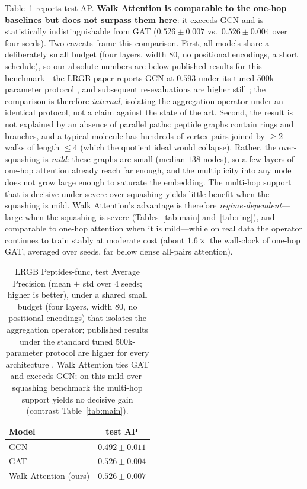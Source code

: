 Table~\ref{tab:lrgb} reports test AP. \textbf{Walk Attention is comparable to
the one-hop baselines but does not surpass them here}: it exceeds GCN and is
statistically indistinguishable from GAT ($0.526\pm0.007$ vs.\ $0.526\pm0.004$
over four seeds). Two caveats frame this comparison. First, all models share a
deliberately small budget (four layers, width $80$, no positional encodings, a
short schedule), so our absolute numbers are below published results for this
benchmark---the LRGB paper reports GCN at $0.593$ under its tuned
$500$k-parameter protocol \cite{dwivedi2022lrgb}, and subsequent re-evaluations
are higher still \cite{tonshoff2023where}; the comparison is therefore
\emph{internal}, isolating the aggregation operator under an identical protocol,
not a claim against the state of the art. Second, the result is not explained by an
absence of parallel paths: peptide graphs contain rings and branches, and a
typical molecule has hundreds of vertex pairs joined by $\ge 2$ walks of length
$\le 4$ (which the quotient ideal would collapse). Rather, the over-squashing is
\emph{mild}: these graphs are small (median $138$ nodes), so a few layers of
one-hop attention already reach far enough, and the multiplicity into any node
does not grow large enough to saturate the embedding. The multi-hop support that
is decisive under severe over-squashing yields little benefit when the squashing
is mild. Walk Attention's advantage is therefore \emph{regime-dependent}---large
when the squashing is severe (Tables~\ref{tab:main} and~\ref{tab:ring}), and
comparable to one-hop attention when it is mild---while on real data the operator
continues to train stably at moderate cost (about $1.6\times$ the wall-clock of
one-hop GAT, averaged over seeds, far below dense all-pairs attention).

\begin{table}[t]
\centering
\caption{LRGB Peptides-func, test Average Precision (mean $\pm$ std over 4
seeds; higher is better), under a shared small budget (four layers, width $80$,
no positional encodings) that isolates the aggregation operator; published
results under the standard tuned $500$k-parameter protocol are higher for every
architecture \cite{dwivedi2022lrgb,tonshoff2023where}. Walk Attention ties GAT
and exceeds GCN; on this mild-over-squashing benchmark the multi-hop support
yields no decisive gain (contrast Table~\ref{tab:main}).}
\label{tab:lrgb}
\begin{tabular}{lc}
\toprule
\textbf{Model} & \textbf{test AP} \\
\midrule
GCN                          & $0.492\pm0.011$ \\
GAT                          & $0.526\pm0.004$ \\
Walk Attention (ours)        & $0.526\pm0.007$ \\
\bottomrule
\end{tabular}
\end{table}

